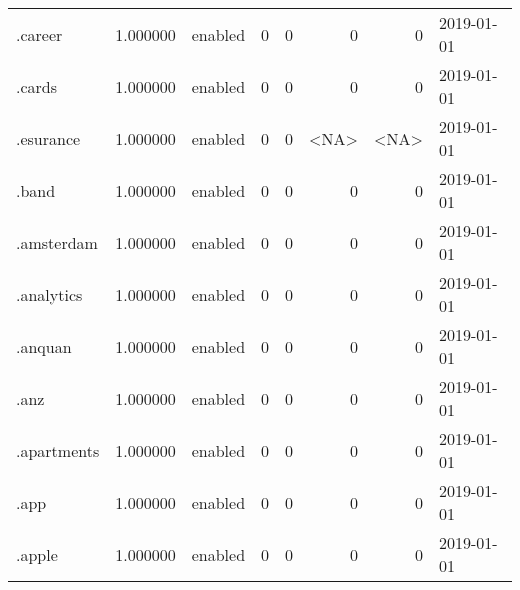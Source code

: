 \begin{tabular}{lrlrrrrl}
.career                   &          1.000000 &         enabled &                           0 &                           0 &                           0 &                   0 &           2019-01-01 \\
.cards                    &          1.000000 &         enabled &                           0 &                           0 &                           0 &                   0 &           2019-01-01 \\
.esurance                 &          1.000000 &         enabled &                           0 &                           0 &                        <NA> &                <NA> &           2019-01-01 \\
.band                     &          1.000000 &         enabled &                           0 &                           0 &                           0 &                   0 &           2019-01-01 \\
.amsterdam                &          1.000000 &         enabled &                           0 &                           0 &                           0 &                   0 &           2019-01-01 \\
.analytics                &          1.000000 &         enabled &                           0 &                           0 &                           0 &                   0 &           2019-01-01 \\
.anquan                   &          1.000000 &         enabled &                           0 &                           0 &                           0 &                   0 &           2019-01-01 \\
.anz                      &          1.000000 &         enabled &                           0 &                           0 &                           0 &                   0 &           2019-01-01 \\
.apartments               &          1.000000 &         enabled &                           0 &                           0 &                           0 &                   0 &           2019-01-01 \\
.app                      &          1.000000 &         enabled &                           0 &                           0 &                           0 &                   0 &           2019-01-01 \\
.apple                    &          1.000000 &         enabled &                           0 &                           0 &                           0 &                   0 &           2019-01-01 \\

\end{tabular}
